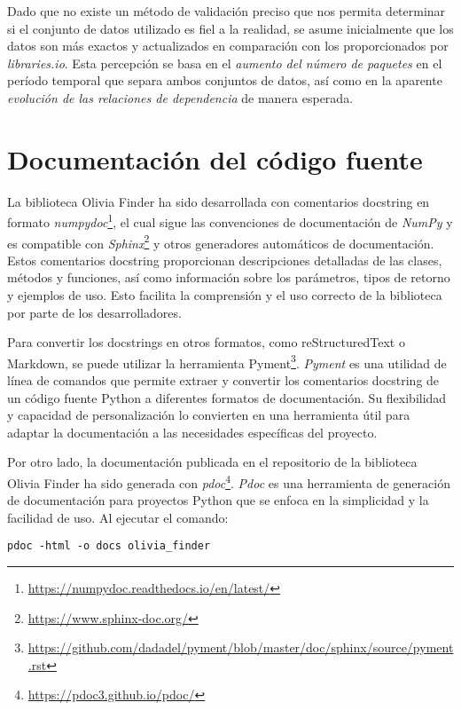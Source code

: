 Dado que no existe un método de validación preciso que nos permita determinar si el conjunto de datos utilizado es fiel a 
la realidad, se asume inicialmente que los datos son más exactos y actualizados en comparación con los proporcionados por 
\textit{libraries.io}. Esta percepción se basa en el \textit{aumento del número de paquetes} en el período temporal que 
separa ambos conjuntos de datos, así como en la aparente \textit{evolución de las relaciones de dependencia} de manera esperada.

\section{Documentación del código fuente}

La biblioteca Olivia Finder ha sido desarrollada con comentarios docstring en formato 
\textit{numpydoc}\footnote{\url{https://numpydoc.readthedocs.io/en/latest/}}, 
el cual sigue las convenciones de documentación de \textit{NumPy} y es compatible con \textit{Sphinx}\footnote{\url{https://www.sphinx-doc.org/}} y otros generadores 
automáticos de documentación. Estos comentarios docstring proporcionan descripciones detalladas de 
las clases, métodos y funciones, así como información sobre los parámetros, tipos de retorno y ejemplos 
de uso. Esto facilita la comprensión y el uso correcto de la biblioteca por parte de los desarrolladores.

Para convertir los docstrings en otros formatos, como reStructuredText o Markdown, se puede utilizar la 
herramienta Pyment\footnote{\url{https://github.com/dadadel/pyment/blob/master/doc/sphinx/source/pyment.rst}}. 
\textit{Pyment} es una utilidad de línea de comandos 
que permite extraer y convertir los comentarios docstring de un código fuente Python a diferentes formatos 
de documentación. Su flexibilidad y capacidad de personalización lo convierten en una herramienta útil 
para adaptar la documentación a las necesidades específicas del proyecto.

Por otro lado, la documentación publicada en el repositorio de la biblioteca Olivia Finder ha sido generada 
con \textit{pdoc}\footnote{\url{https://pdoc3.github.io/pdoc/}}. \textit{Pdoc} es una herramienta de generación de documentación 
para proyectos Python que se enfoca en la simplicidad y la facilidad de uso. Al ejecutar el comando:

\begin{center}
    \texttt{pdoc -html -o docs olivia\_finder}
\end{center}

